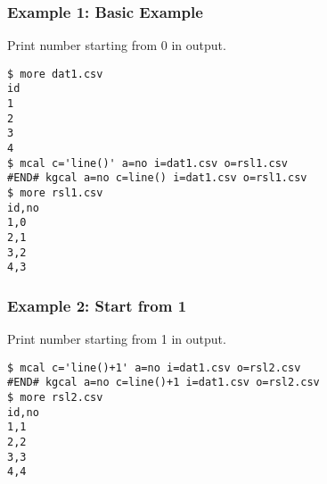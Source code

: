 \subsubsection*{Example 1: Basic Example}

Print number starting from 0 in output.


\begin{Verbatim}[baselinestretch=0.7,frame=single]
$ more dat1.csv
id
1
2
3
4
$ mcal c='line()' a=no i=dat1.csv o=rsl1.csv
#END# kgcal a=no c=line() i=dat1.csv o=rsl1.csv
$ more rsl1.csv
id,no
1,0
2,1
3,2
4,3
\end{Verbatim}
\subsubsection*{Example 2: Start from 1}

Print number starting from 1 in output.


\begin{Verbatim}[baselinestretch=0.7,frame=single]
$ mcal c='line()+1' a=no i=dat1.csv o=rsl2.csv
#END# kgcal a=no c=line()+1 i=dat1.csv o=rsl2.csv
$ more rsl2.csv
id,no
1,1
2,2
3,3
4,4
\end{Verbatim}
